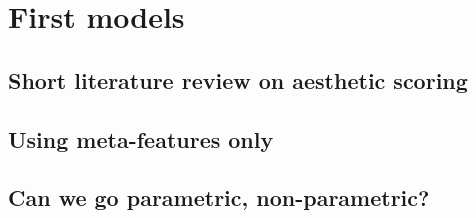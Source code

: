 \section{First models}

\subsection{Short literature review on aesthetic scoring}






\subsection{Using meta-features only}




\subsection{Can we go parametric, non-parametric?}